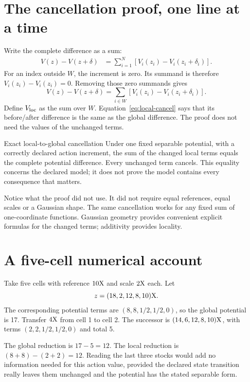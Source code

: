 \section{The cancellation proof, one line at a time}
Write the complete difference as a sum:
\begin{align}
 V(z)-V(z+\delta)
 &=\sum_{i=1}^{N}\left[V_i(z_i)-V_i(z_i+\delta_i)\right].
\end{align}
For an index outside $W$, the increment is zero. Its summand is therefore $V_i(z_i)-V_i(z_i)=0$. Removing those zero summands gives
\begin{equation}\label{eq:local-cancel}
 V(z)-V(z+\delta)
 =\sum_{i\in W}\left[V_i(z_i)-V_i(z_i+\delta_i)\right].
\end{equation}
Define $V_{\rm loc}$ as the sum over $W$. Equation~\eqref{eq:local-cancel} says that its before/after difference is the same as the global difference. The proof does not need the values of the unchanged terms.

\begin{lawbox}{Exact local-to-global cancellation}
Under one fixed separable potential, with a correctly declared action increment, the sum of the changed local terms equals the complete potential difference. Every unchanged term cancels. This equality concerns the declared model; it does not prove the model contains every consequence that matters.
\end{lawbox}

Notice what the proof did not use. It did not require equal references, equal scales or a Gaussian shape. The same cancellation works for any fixed sum of one-coordinate functions. Gaussian geometry provides convenient explicit formulas for the changed terms; additivity provides locality.

\section{A five-cell numerical account}
Take five cells with reference $10\mathrm{X}$ and scale $2\mathrm{X}$ each. Let
\[
 z=(18,2,12,8,10)\mathrm{X}.
\]
The corresponding potential terms are $(8,8,1/2,1/2,0)$, so the global potential is 17. Transfer $4\mathrm{X}$ from cell 1 to cell 2. The successor is $(14,6,12,8,10)\mathrm{X}$, with terms $(2,2,1/2,1/2,0)$ and total 5.

The global reduction is $17-5=12$. The local reduction is $(8+8)-(2+2)=12$. Reading the last three stocks would add no information needed for this action value, provided the declared state transition really leaves them unchanged and the potential has the stated separable form.

